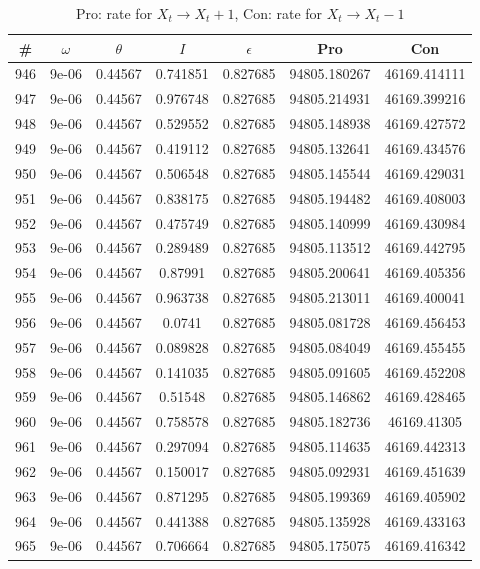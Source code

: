 \newpage
\begin{table}
\caption{Pro: rate for $X_t \rightarrow X_t + 1$, Con: rate for $X_t \rightarrow X_t - 1$}
\begin{tabular*}{\linewidth}{c|c|c|c|c|c|c}
\# & $\omega$ & $\theta$ & $I$ & $\epsilon$ & Pro & Con \\
\hline
946 & 9e-06 & 0.44567 & 0.741851 & 0.827685 & 94805.180267 & 46169.414111\\
947 & 9e-06 & 0.44567 & 0.976748 & 0.827685 & 94805.214931 & 46169.399216\\
948 & 9e-06 & 0.44567 & 0.529552 & 0.827685 & 94805.148938 & 46169.427572\\
949 & 9e-06 & 0.44567 & 0.419112 & 0.827685 & 94805.132641 & 46169.434576\\
950 & 9e-06 & 0.44567 & 0.506548 & 0.827685 & 94805.145544 & 46169.429031\\
951 & 9e-06 & 0.44567 & 0.838175 & 0.827685 & 94805.194482 & 46169.408003\\
952 & 9e-06 & 0.44567 & 0.475749 & 0.827685 & 94805.140999 & 46169.430984\\
953 & 9e-06 & 0.44567 & 0.289489 & 0.827685 & 94805.113512 & 46169.442795\\
954 & 9e-06 & 0.44567 & 0.87991 & 0.827685 & 94805.200641 & 46169.405356\\
955 & 9e-06 & 0.44567 & 0.963738 & 0.827685 & 94805.213011 & 46169.400041\\
956 & 9e-06 & 0.44567 & 0.0741 & 0.827685 & 94805.081728 & 46169.456453\\
957 & 9e-06 & 0.44567 & 0.089828 & 0.827685 & 94805.084049 & 46169.455455\\
958 & 9e-06 & 0.44567 & 0.141035 & 0.827685 & 94805.091605 & 46169.452208\\
959 & 9e-06 & 0.44567 & 0.51548 & 0.827685 & 94805.146862 & 46169.428465\\
960 & 9e-06 & 0.44567 & 0.758578 & 0.827685 & 94805.182736 & 46169.41305\\
961 & 9e-06 & 0.44567 & 0.297094 & 0.827685 & 94805.114635 & 46169.442313\\
962 & 9e-06 & 0.44567 & 0.150017 & 0.827685 & 94805.092931 & 46169.451639\\
963 & 9e-06 & 0.44567 & 0.871295 & 0.827685 & 94805.199369 & 46169.405902\\
964 & 9e-06 & 0.44567 & 0.441388 & 0.827685 & 94805.135928 & 46169.433163\\
965 & 9e-06 & 0.44567 & 0.706664 & 0.827685 & 94805.175075 & 46169.416342\\

\end{tabular*}
\end{table}
